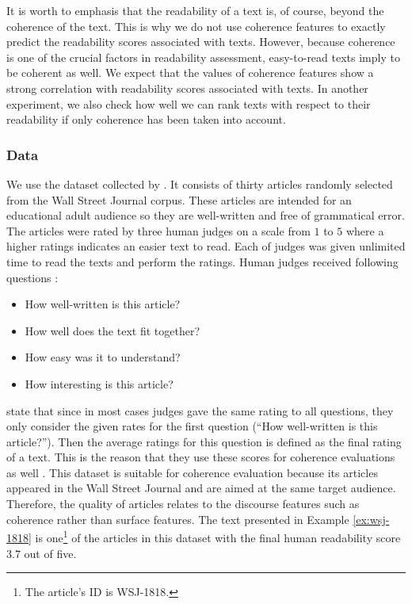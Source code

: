 It is worth to emphasis that the readability of a text is, of course, beyond the coherence of the text. 
This is why we do not use coherence features to exactly predict the readability scores associated with texts. 
However, because coherence is one of the crucial factors in readability assessment, easy-to-read texts imply to be  coherent as well. 
We expect that the values of coherence features show a strong correlation with readability scores associated with texts. 
In another experiment, we also check how well we can rank texts with respect to their readability if only coherence has been taken into account. 


\subsubsection{Data}
\label{sec:data_pitler}
We use the dataset collected by . 
It consists of thirty articles randomly selected from the Wall Street Journal corpus. 
These articles are intended for an educational adult audience so they are well-written and free of grammatical error. 
The articles were rated by three human judges on a scale from $1$ to $5$ where a higher ratings indicates an easier text to read. 
Each of judges was given unlimited time to read the texts and perform the ratings. 
Human judges received following questions \cite{pitler08}:
\begin{itemize}
	\item How well-written is this article?
	\item How well does the text fit together?
	\item How easy was it to understand?
	\item How interesting is this article?
\end{itemize} 
 
 state that since in most cases judges gave the same rating to all questions, they only consider the given rates for the first question (``How well-written is this article?''). 
Then the average ratings for this question is defined as the final rating of a text. 
This is the reason that they use these scores for coherence evaluations as well \cite{pitler08}. 
This dataset is suitable for coherence evaluation because its articles appeared in the Wall Street Journal and are aimed at the same target audience. 
Therefore, the quality of articles relates to the discourse features such as coherence rather than surface features. 
The text presented in Example \ref{ex:wsj-1818} is one\footnote{The article's ID is WSJ-1818.} of the articles in this dataset with the final human readability score 3.7 out of five.  


